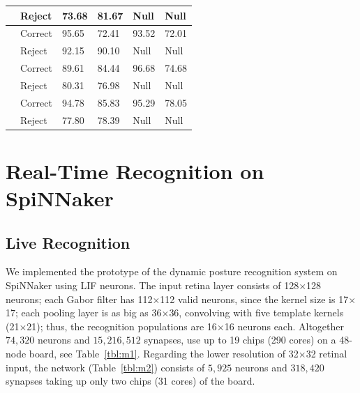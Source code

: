 \begin{table}
\begin{tabular}{p{}|p{}<{\centering}|p{}<{\centering}|p{}<{\centering}|p{}<{\centering}|p{}<{\centering}}
			\\ 
			& Reject & 73.68	& 81.67 	& Null	& Null
			\\ \hline
			& Correct & 95.65	& 72.41	& 93.52	& 72.01
			\\ 
			& Reject & 92.15	& 90.10 	& Null	& Null
			\\ \hline
			& Correct & 89.61	& 84.44	& 96.68	& 74.68
			\\ 
			& Reject & 80.31	& 76.98 	& Null	& Null
			\\ \hline\hline
			& Correct & 94.78	& 85.83	& 95.29	& 78.05
			\\ 
			& Reject & 77.80	& 78.39 	& Null	& Null
			\\ \hline
	\end{tabular}
	\label{tbl:rsl}
\end{table}

\section{Real-Time Recognition on SpiNNaker}
\subsection{Live Recognition}
We implemented the prototype of the dynamic posture recognition system on SpiNNaker using LIF neurons. 
The input retina layer consists of 128$\times$128 neurons; 
each Gabor filter has 112$\times$112 valid neurons, since the kernel size is 17$\times$17; 
each pooling layer is as big as 36$\times$36, convolving with five template kernels (21$\times$21); 
thus, the recognition populations are 16$\times$16 neurons each. Altogether $74,320$ neurons and $15,216,512$ synapses, use up to 19 chips (290 cores) on a 48-node board, see Table~\ref{tbl:m1}. Regarding the lower resolution of 32$\times$32 retinal input, the network (Table~\ref{tbl:m2}) consists of $5,925$ neurons and $318,420$ synapses taking up only two chips (31 cores) of the board.

